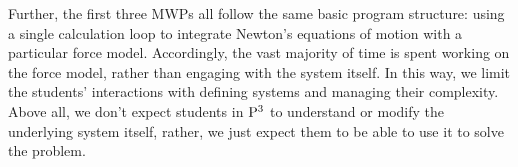 \documentclass{msuphddissertation}
\begin{document}
\begin{doublespace}
\begin{appendices}
Further, the first three MWPs all follow the same basic program structure: using a single calculation loop to integrate Newton's equations of motion with a particular force model.  Accordingly, the vast majority of time is spent working on the force model, rather than engaging with the system itself.  In this way, we limit the students' interactions with defining systems and managing their complexity.  Above all, we don't expect students in ${\rm P}^{3}$ to understand or modify the underlying system itself, rather, we just expect them to be able to use it to solve the problem.

\end{appendices}


\end{doublespace}



\end{document}
